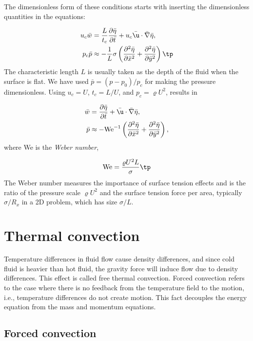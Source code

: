 \documentclass[graybox,envcountchap,sectrefs,final]{svmonodo}
\begin{document}

The dimensionless form of these conditions starts with inserting the
dimensionless quantities in the equations:

\begin{align*}
u_c\bar w &= \frac{L}{t_c}
\frac{\partial\bar\eta}{\partial\bar t} +
u_c\bar\u\cdot\bar\nabla\bar\eta,\\ 
p_c \bar p &\approx
-\frac{1}{L}\sigma\left(\frac{\partial^2\bar\eta}{\partial \bar x^2} +
\frac{\partial^2\bar\eta}{\partial \bar y^2}\right)\tp
\end{align*}
The characteristic length $L$ is usually taken as the depth of the fluid
when the surface is flat. We have used
$\bar p = (p - p_0)/p_c$ for making the pressure dimensionless.
Using $u_c=U$, $t_c=L/U$, and $p_c = \varrho U^2$, results in

\begin{align}
\bar w &= \frac{\partial\bar\eta}{\partial\bar t} +
\bar\u\cdot\bar\nabla\bar\eta,\\ 
\bar p &\approx
- \hbox{We}^{-1}\left(\frac{\partial^2\bar\eta}{\partial \bar x^2} +
\frac{\partial^2\bar\eta}{\partial \bar y^2}\right),
\label{scale:fluid:NS:surface_tension2}
\end{align}
where We is the \emph{Weber number},

\begin{equation}
\hbox{We} = \frac{\varrho U^2L}{\sigma}\tp
\end{equation}
The Weber number measures the importance of surface tension effects and
is the ratio of the pressure scale $\varrho U^2$ and the surface
tension force per area, typically $\sigma/R_x$ in a 2D problem, which
has size $\sigma/L$.

\section{Thermal convection}

Temperature differences in fluid flow cause density differences, and since
cold fluid is heavier than hot fluid, the gravity force will induce
flow due to density differences. This effect is called free thermal
convection. Forced convection refers to the case where there is no
feedback from the temperature field to the motion, i.e., temperature
differences do not create motion. This fact decouples the energy
equation from the mass and momentum equations.

\subsection{Forced convection}
\end{document}
